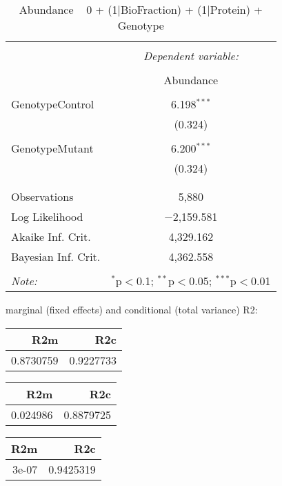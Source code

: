 \documentclass[11pt]{report}
\begin{document}
\begin{table}[!htbp] \centering 
  \caption{Abundance ~ 0 + (1|BioFraction) + (1|Protein) + Genotype} 
  \label{} 
\begin{tabular}{@{\extracolsep{5pt}}lc} 
\\[-1.8ex]\hline 
\hline \\[-1.8ex] 
 & \multicolumn{1}{c}{\textit{Dependent variable:}} \\ 
\cline{2-2} 
\\[-1.8ex] & Abundance \\ 
\hline \\[-1.8ex] 
 GenotypeControl & 6.198$^{***}$ \\ 
  & (0.324) \\ 
  & \\ 
 GenotypeMutant & 6.200$^{***}$ \\ 
  & (0.324) \\ 
  & \\ 
\hline \\[-1.8ex] 
Observations & 5,880 \\ 
Log Likelihood & $-$2,159.581 \\ 
Akaike Inf. Crit. & 4,329.162 \\ 
Bayesian Inf. Crit. & 4,362.558 \\ 
\hline 
\hline \\[-1.8ex] 
\textit{Note:}  & \multicolumn{1}{r}{$^{*}$p$<$0.1; $^{**}$p$<$0.05; $^{***}$p$<$0.01} \\ 
\end{tabular} 
\end{table} 
marginal (fixed effects) and conditional (total variance) R2:

\begin{tabular}{r|r}
\hline
R2m & R2c\\
\hline
0.8730759 & 0.9227733\\
\hline
\end{tabular}

\begin{tabular}{r|r}
\hline
R2m & R2c\\
\hline
0.024986 & 0.8879725\\
\hline
\end{tabular}

\begin{tabular}{r|r}
\hline
R2m & R2c\\
\hline
3e-07 & 0.9425319\\
\hline
\end{tabular}
\end{document}
